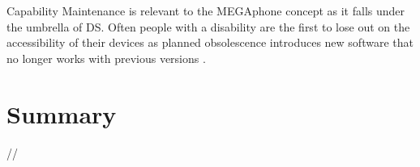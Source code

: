 Capability Maintenance is relevant to the MEGAphone concept as it falls under the umbrella of DS.
Often people with a disability are the first to lose out on the accessibility of their devices as planned obsolescence introduces new software that no longer works with previous versions \cite{obsolescence2}. %


\section{Summary}
//

